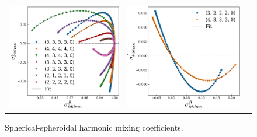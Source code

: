 \documentclass[twocolumn,aps,prd,floatfix,preprintnumbers,a4paper,nofootinbib,
superscriptaddress,10pt]{revtex4-1}
\begin{document}
\begin{figure}
  \begin{tabular}{lcr}
    \includegraphics[width=\figfactor\textwidth]{fig/issue2_ysprod_1.pdf} & \includegraphics[width=\figfactor\textwidth]{fig/issue2_ysprod_2.pdf}
  \end{tabular}
	\caption{ Spherical-spheroidal harmonic mixing coefficients. }
\end{figure}
\end{document}
